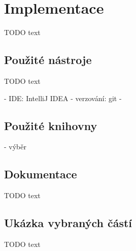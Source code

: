 \chapter{Implementace}

TODO text

\section{Použité nástroje}

TODO text

- IDE: IntelliJ IDEA
- verzování: git
- 

\section{Použité knihovny}

- výběr

\section{Dokumentace}

TODO text

\section{Ukázka vybraných částí}

TODO text
